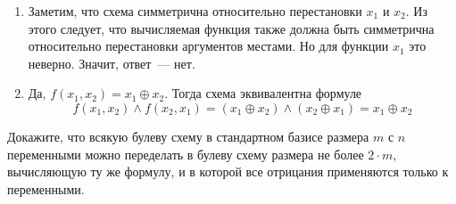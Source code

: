 \begin{Answer}
    \noindent
    \begin{enumerate}[label=\textbf{\alph*)}]
        \item
            Заметим, что схема симметрична относительно перестановки $ x_1 $ и $ x_2 $.
            Из этого следует, что вычисляемая функция также должна быть симметрична относительно перестановки аргументов местами.
            Но для функции $ x_1 $ это неверно.
            Значит, ответ~--- нет.
        \item
            Да, $ f(x_1, x_2) = x_1 \oplus x_2 $.
            Тогда схема эквивалентна формуле
            \[
                f(x_1, x_2) \wedge f(x_2, x_1) = (x_1 \oplus x_2) \wedge (x_2 \oplus x_1) = x_1 \oplus x_2
            \]
    \end{enumerate}
\end{Answer}


\begin{Exercise}[counter=SecExercise, label={exercise:boolean:move_negation_to_arguments}]
    \noindent
    Докажите, что всякую булеву схему в стандартном базисе размера $ m $ с $ n $ переменными можно переделать в булеву схему размера не более $ 2 \cdot m $,
    вычисляющую ту же формулу, и в которой все отрицания применяются только к переменными.
\end{Exercise}

